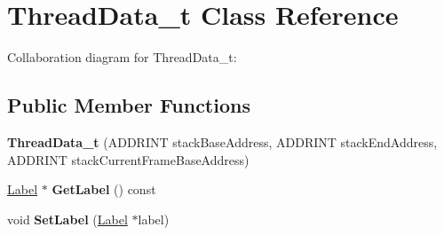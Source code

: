 \hypertarget{classThreadData__t}{\section{Thread\-Data\-\_\-t Class Reference}
\label{classThreadData__t}
}


Collaboration diagram for Thread\-Data\-\_\-t\-:
\subsection*{Public Member Functions}
\begin{DoxyCompactItemize}
\item 
\hypertarget{classThreadData__t_a22203941b96bbe6cea34b4cc4a6070ea}{{\bfseries Thread\-Data\-\_\-t} (A\-D\-D\-R\-I\-N\-T stack\-Base\-Address, A\-D\-D\-R\-I\-N\-T stack\-End\-Address, A\-D\-D\-R\-I\-N\-T stack\-Current\-Frame\-Base\-Address)}\label{classThreadData__t_a22203941b96bbe6cea34b4cc4a6070ea}

\item 
\hypertarget{classThreadData__t_a1d3a20be3e399d4dfa71bf0f1269b44d}{\hyperlink{classLabel}{Label} $\ast$ {\bfseries Get\-Label} () const }\label{classThreadData__t_a1d3a20be3e399d4dfa71bf0f1269b44d}

\item 
\hypertarget{classThreadData__t_a7dce48f6655568d46cd5ba63d476cc4c}{void {\bfseries Set\-Label} (\hyperlink{classLabel}{Label} $\ast$label)}\label{classThreadData__t_a7dce48f6655568d46cd5ba63d476cc4c}

\end{DoxyCompactItemize}
